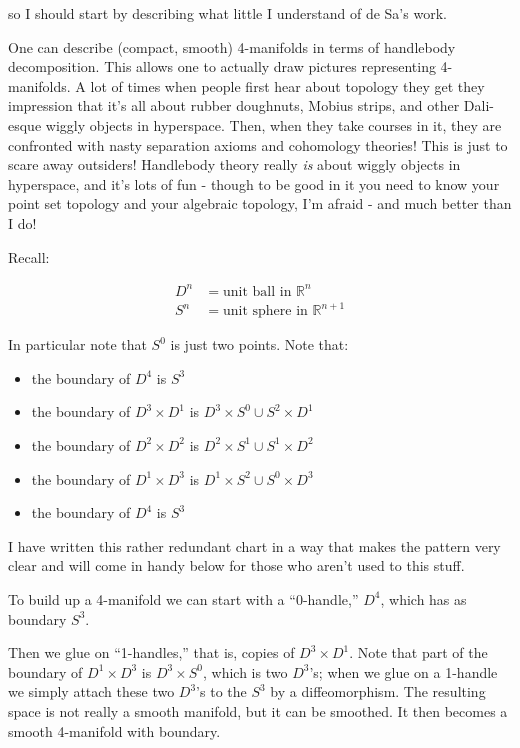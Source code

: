 \documentclass{article}
\def\tightlist{}
\begin{document}
so I should start by describing what little I understand of de Sa's
work.

One can describe (compact, smooth) 4-manifolds in terms of handlebody
decomposition. This allows one to actually draw pictures representing
4-manifolds. A lot of times when people first hear about topology they
get they impression that it's all about rubber doughnuts, Mobius strips,
and other Dali-esque wiggly objects in hyperspace. Then, when they take
courses in it, they are confronted with nasty separation axioms and
cohomology theories! This is just to scare away outsiders! Handlebody
theory really \emph{is} about wiggly objects in hyperspace, and it's
lots of fun - though to be good in it you need to know your point set
topology and your algebraic topology, I'm afraid - and much better than
I do!

Recall:

\[\begin{aligned}D^n &= \mbox{unit ball in $\mathbb{R}^n$} \\ S^n &= \mbox{unit sphere in $\mathbb{R}^{n+1}$}\end{aligned}\]

In particular note that \(S^0\) is just two points. Note that:

\begin{itemize}
\tightlist
\item
  the boundary of \(D^4\) is \(S^3\)
\item
  the boundary of \(D^3 \times D^1\) is
  \(D^3 \times S^0 \cup S^2 \times D^1\)
\item
  the boundary of \(D^2 \times D^2\) is
  \(D^2 \times S^1 \cup S^1 \times D^2\)
\item
  the boundary of \(D^1 \times D^3\) is
  \(D^1 \times S^2 \cup S^0 \times D^3\)
\item
  the boundary of \(D^4\) is \(S^3\)
\end{itemize}

I have written this rather redundant chart in a way that makes the
pattern very clear and will come in handy below for those who aren't
used to this stuff.

To build up a 4-manifold we can start with a ``0-handle,'' \(D^4\),
which has as boundary \(S^3\).

Then we glue on ``1-handles,'' that is, copies of \(D^3 \times D^1\).
Note that part of the boundary of \(D^1 \times D^3\) is
\(D^3 \times S^0\), which is two \(D^3\)'s; when we glue on a 1-handle
we simply attach these two \(D^3\)'s to the \(S^3\) by a diffeomorphism.
The resulting space is not really a smooth manifold, but it can be
smoothed. It then becomes a smooth 4-manifold with boundary.
\end{document}

